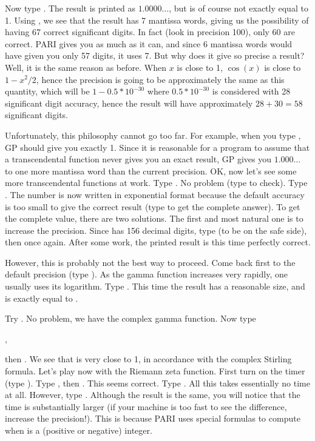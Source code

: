 Now type . The result is printed as $1.0000\dots$, but
is of course not exactly equal to 1. Using , we see that the
result has 7 mantissa words, giving us the possibility of having 67
correct significant digits. In fact (look in precision 100), only 60 are
correct. PARI gives you as much as it can, and since 6 mantissa words
would have given you only 57 digits, it uses 7. But why does it give so
precise a result? Well, it is the same reason as before. When $x$ is close
to 1, $\cos(x)$ is close to $1-x^2/2$, hence the precision is going to be
approximately the same as this quantity, which will be $1-0.5*10^{-30}$ where
$0.5*10^{-30}$ is considered with 28 significant digit accuracy, hence the
result will have approximately $28+30=58$ significant digits.

Unfortunately, this philosophy cannot go too far. For example, when you
type , GP should give you exactly 1. Since it is reasonable for
a program to assume that a transcendental function never gives you an exact
result, GP gives you $1.000\dots$ to one more mantissa word than the current
precision.
\medskip
OK, now let's see some more transcendental functions at work. Type
. No problem (type  to check). Type .
The number is now written in exponential format because the default
accuracy is too small to give the correct result (type  to get the
complete answer).
To get the complete value, there are two solutions. The first and most natural
one is to increase the precision. Since  has 156 decimal
digits, type  (to be on the safe side), then 
once again. After some work, the printed result is this time perfectly
correct.

However, this is probably not the best way to proceed. Come back first to the
default precision (type ). As the gamma function increases
very rapidly, one usually uses its logarithm. Type . This
time the result has a reasonable size, and is exactly equal to .

Try . No problem, we have the complex gamma function.
Now type

,

\noindent then . We see that  is very close to 1,
in accordance with the complex Stirling formula. \smallskip
%
Let's play now with the Riemann zeta function. First turn on the timer (type
\kbd{\#}). Type , then . This seems correct. Type
. All this takes essentially no time at all. However, type
. Although the result is the same, you will notice that the
time is substantially larger (if your machine is too fast to see the
difference, increase the precision!). This is because PARI uses special
formulas to compute  when  is a (positive or negative)
integer.

